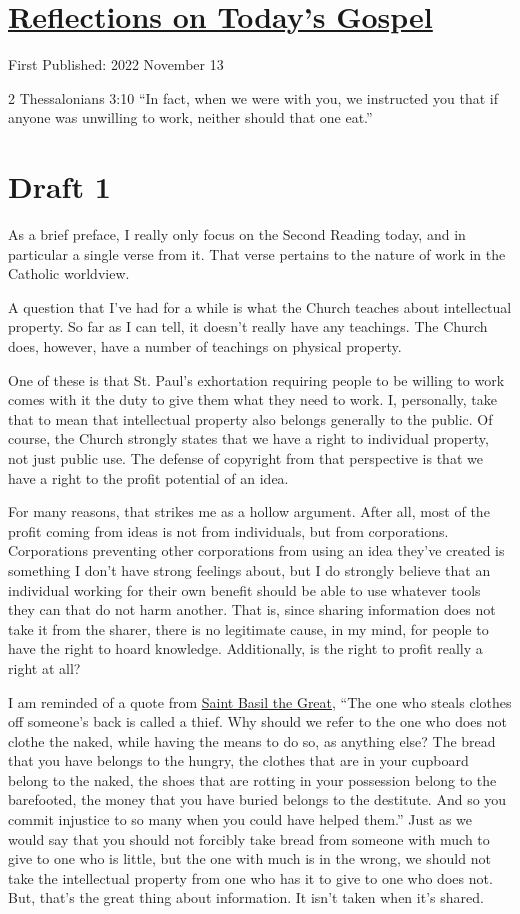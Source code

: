 \documentclass[12pt]{article}[titlepage]
\newcommand{\say}[1]{``#1''}
\newcommand{\1}{\={a}}
\newcommand{\2}{\={e}}
\newcommand{\3}{\={\i}}
\newcommand{\4}{\=o}
\newcommand{\5}{\=u}
\newcommand{\6}{\={A}}
\renewcommand{\,}{\textsuperscript{,}}
\begin{document}
\doublespacing
\section{\href{reflections-on-readings-33-ordinary-c-22.html}{Reflections on Today's Gospel}}
First Published: 2022 November 13

2 Thessalonians 3:10 \say{In fact, when we were with you, we instructed you that if anyone was unwilling to work, neither should that one eat.}

\section{Draft 1}
As a brief preface, I really only focus on the Second Reading today, and in particular a single verse from it.
That verse pertains to the nature of work in the Catholic worldview.

A question that I've had for a while is what the Church teaches about intellectual property.
So far as I can tell, it doesn't really have any teachings.
The Church does, however, have a number of teachings on physical property.

One of these is that St. Paul's exhortation requiring people to be willing to work comes with it the duty to give them what they need to work.
I, personally, take that to mean that intellectual property also belongs generally to the public.
Of course, the Church strongly states that we have a right to individual property, not just public use.
The defense of copyright from that perspective is that we have a right to the profit potential of an idea.

For many reasons, that strikes me as a hollow argument.
After all, most of the profit coming from ideas is not from individuals, but from corporations.
Corporations preventing other corporations from using an idea they've created is something I don't have strong feelings about, but I do strongly believe that an individual working for their own benefit should be able to use whatever tools they can that do not harm another.
That is, since sharing information does not take it from the sharer, there is no legitimate cause, in my mind, for people to have the right to hoard knowledge.
Additionally, is the right to profit really a right at all?

I am reminded of a quote from \href{https://incommunion.org/2010/11/24/the-social-doctrine-of-st-basil-the-great/}{Saint Basil the Great}, \say{The one who steals clothes off someone's back is called a thief. Why should we refer to the one who does not clothe the naked, while having the means to do so, as anything else? The bread that you have belongs to the hungry, the clothes that are in your cupboard belong to the naked, the shoes that are rotting in your possession belong to the barefooted, the money that you have buried belongs to the destitute. And so you commit injustice to so many when you could have helped them.}
Just as we would say that you should not forcibly take bread from someone with much to give to one who is little, but the one with much is in the wrong, we should not take the intellectual property from one who has it to give to one who does not.
But, that's the great thing about information.
It isn't taken when it's shared.
\end{document}
